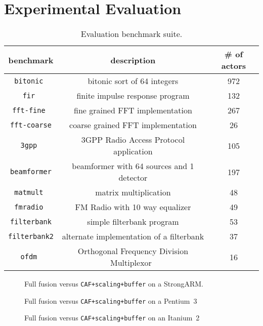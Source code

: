 \section{Experimental Evaluation}
\label{sec:evaluation}

\begin{table}[t]
\center
\label{tab:benchmarks}
\vspace{-12pt}
{\tiny
\begin{tabular}{|c|c|c|} \hline
{\bf benchmark}&{\bf description}&{\bf \# of actors}\\ \hline \hline
\texttt{bitonic	} &bitonic sort of 64 integers	&	972 \\ \hline
\texttt{fir	      } &finite impulse response program	&	132 \\ \hline
\texttt{fft-fine	} &fine grained FFT implementation	&	267 \\ \hline
\texttt{fft-coarse} &coarse grained FFT implementation	&	26 \\ \hline
\texttt{3gpp	} &3GPP Radio Access Protocol application	&	105 \\ \hline
\texttt{beamformer} &beamformer with 64 sources and 1 detector& 197 \\ \hline
\texttt{matmult	} &matrix multiplication	&	48 \\ \hline
\texttt{fmradio	} &FM Radio with 10 way equalizer	&	49 \\ \hline
\texttt{filterbank} &simple filterbank program	&	53 \\ \hline
\texttt{filterbank2}&alternate implementation of a filterbank &	37 \\ \hline
\texttt{ofdm	 }& Orthogonal Frequency Division Multiplexor~\cite{spectrumware}	&	16 \\ \hline
\end{tabular}
}
\caption{Evaluation benchmark suite.}
\end{table}

\begin{figure}
\begin{minipage}{3.35in}
\caption{Full fusion versus \texttt{CAF+scaling+buffer} on a StrongARM.\protect\label{fig:arm-perf}}

\caption{Full fusion versus \texttt{CAF+scaling+buffer} on a Pentium~3\protect\label{fig:p3-perf}}

\caption{Full fusion versus \texttt{CAF+scaling+buffer} on an Itanium~2\protect\label{fig:i2-perf}}
\end{minipage}
\end{figure}

